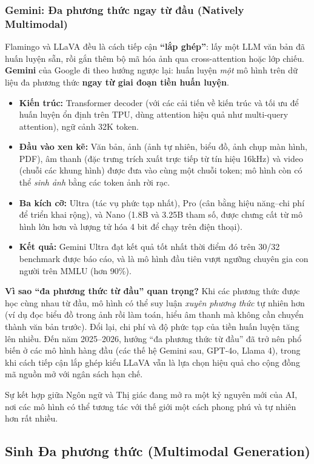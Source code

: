 \subsubsection{Gemini: Đa phương thức ngay từ đầu (Natively Multimodal) \newtag}
\label{sssec:gemini}
Flamingo và LLaVA đều là cách tiếp cận \textbf{“lắp ghép”}: lấy một LLM văn bản đã huấn luyện sẵn, rồi gắn thêm bộ mã hóa ảnh qua cross-attention hoặc lớp chiếu. \textbf{Gemini} \cite{geminiteam2023gemini} của Google đi theo hướng ngược lại: huấn luyện \emph{một} mô hình trên dữ liệu đa phương thức \textbf{ngay từ giai đoạn tiền huấn luyện}.
\begin{itemize}
	\item \textbf{Kiến trúc:} Transformer decoder (với các cải tiến về kiến trúc và tối ưu để huấn luyện ổn định trên TPU, dùng attention hiệu quả như multi-query attention), ngữ cảnh 32K token.
	\item \textbf{Đầu vào xen kẽ:} Văn bản, ảnh (ảnh tự nhiên, biểu đồ, ảnh chụp màn hình, PDF), âm thanh (đặc trưng trích xuất trực tiếp từ tín hiệu 16kHz) và video (chuỗi các khung hình) được đưa vào cùng một chuỗi token; mô hình còn có thể \emph{sinh ảnh} bằng các token ảnh rời rạc.
	\item \textbf{Ba kích cỡ:} Ultra (tác vụ phức tạp nhất), Pro (cân bằng hiệu năng--chi phí để triển khai rộng), và Nano (1.8B và 3.25B tham số, được chưng cất từ mô hình lớn hơn và lượng tử hóa 4 bit để chạy trên điện thoại).
	\item \textbf{Kết quả:} Gemini Ultra đạt kết quả tốt nhất thời điểm đó trên 30/32 benchmark được báo cáo, và là mô hình đầu tiên vượt ngưỡng chuyên gia con người trên MMLU (hơn 90\%).
\end{itemize}
\textbf{Vì sao “đa phương thức từ đầu” quan trọng?} Khi các phương thức được học cùng nhau từ đầu, mô hình có thể suy luận \emph{xuyên phương thức} tự nhiên hơn (ví dụ đọc biểu đồ trong ảnh rồi làm toán, hiểu âm thanh mà không cần chuyển thành văn bản trước). Đổi lại, chi phí và độ phức tạp của tiền huấn luyện tăng lên nhiều. Đến năm 2025--2026, hướng “đa phương thức từ đầu” đã trở nên phổ biến ở các mô hình hàng đầu (các thế hệ Gemini sau, GPT-4o, Llama 4), trong khi cách tiếp cận lắp ghép kiểu LLaVA vẫn là lựa chọn hiệu quả cho cộng đồng mã nguồn mở với ngân sách hạn chế.

Sự kết hợp giữa Ngôn ngữ và Thị giác đang mở ra một kỷ nguyên mới của AI, nơi các mô hình có thể tương tác với thế giới một cách phong phú và tự nhiên hơn rất nhiều.

\subsection{Sinh Đa phương thức (Multimodal Generation)}
\label{ssec:multimodal_generation}

